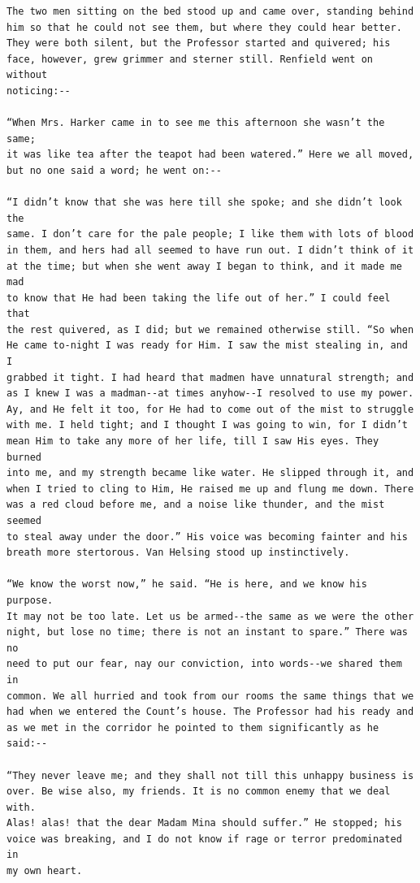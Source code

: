 \documentclass{article}
\begin{document}
\begin{verbatim}
The two men sitting on the bed stood up and came over, standing behind
him so that he could not see them, but where they could hear better.
They were both silent, but the Professor started and quivered; his
face, however, grew grimmer and sterner still. Renfield went on without
noticing:--

“When Mrs. Harker came in to see me this afternoon she wasn’t the same;
it was like tea after the teapot had been watered.” Here we all moved,
but no one said a word; he went on:--

“I didn’t know that she was here till she spoke; and she didn’t look the
same. I don’t care for the pale people; I like them with lots of blood
in them, and hers had all seemed to have run out. I didn’t think of it
at the time; but when she went away I began to think, and it made me mad
to know that He had been taking the life out of her.” I could feel that
the rest quivered, as I did; but we remained otherwise still. “So when
He came to-night I was ready for Him. I saw the mist stealing in, and I
grabbed it tight. I had heard that madmen have unnatural strength; and
as I knew I was a madman--at times anyhow--I resolved to use my power.
Ay, and He felt it too, for He had to come out of the mist to struggle
with me. I held tight; and I thought I was going to win, for I didn’t
mean Him to take any more of her life, till I saw His eyes. They burned
into me, and my strength became like water. He slipped through it, and
when I tried to cling to Him, He raised me up and flung me down. There
was a red cloud before me, and a noise like thunder, and the mist seemed
to steal away under the door.” His voice was becoming fainter and his
breath more stertorous. Van Helsing stood up instinctively.

“We know the worst now,” he said. “He is here, and we know his purpose.
It may not be too late. Let us be armed--the same as we were the other
night, but lose no time; there is not an instant to spare.” There was no
need to put our fear, nay our conviction, into words--we shared them in
common. We all hurried and took from our rooms the same things that we
had when we entered the Count’s house. The Professor had his ready and
as we met in the corridor he pointed to them significantly as he said:--

“They never leave me; and they shall not till this unhappy business is
over. Be wise also, my friends. It is no common enemy that we deal with.
Alas! alas! that the dear Madam Mina should suffer.” He stopped; his
voice was breaking, and I do not know if rage or terror predominated in
my own heart.


\end{verbatim}
\end{document}
